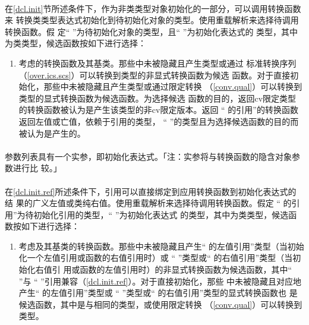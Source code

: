 \paragraph{}
在\ref{dcl.init}节所述条件下，作为非类类型对象初始化的一部分，可以调用转换函数来
转换类类型表达式初始化到待初始化对象的类型。使用重载解析来选择待调用转换函数。假
定`` ''为待初始化对象的类型，且`` ''为初始化表达式的
类型，其中为类类型，候选函数按如下进行选择：
\begin{enumerate}
  \item{考虑的转换函数及其基类。那些中未被隐藏且产生类型或通过
    标准转换序列（\ref{over.ics.scs}）可以转换到类型的非显式转换函数为候选
    函数。对于直接初始化，那些中未被隐藏且产生类型或通过限定转换
    （\ref{conv.qual}）可以转换到类型的显式转换函数为候选函数。为选择候选
    函数的目的，返回cv限定类型的转换函数被认为是产生该类型的非cv限定版本。返回
    `` 的引用''的转换函数返回左值或亡值，依赖于引用的类型，
    `` ''的类型且为选择候选函数的目的而被认为是产生的。}
\end{enumerate}

\paragraph{}
参数列表具有一个实参，即初始化表达式。「注：实参将与转换函数的隐含对象参数进行比
较。」

\paragraph{}
在\ref{dcl.init.ref}所述条件下，引用可以直接绑定到应用转换函数到初始化表达式的结
果的广义左值或类纯右值。使用重载解析来选择待调用转换函数。假定
`` 的引用''为待初始化引用的类型，`` ''为初始化表达式
的类型，其中为类类型，候选函数按如下进行选择：
\begin{enumerate}
  \item{考虑及其基类的转换函数。那些中未被隐藏且产生``
    的左值引用''类型（当初始化一个左值引用或函数的右值引用时}）或
    `` ''类型或`` 的右值引用''类型（当初始化右值引
    用或函数的左值引用时）的非显式转换函数为候选函数，其中`` ''与
    `` ''引用兼容（\ref{dcl.init.ref}）。对于直接初始化，那些
    中未被隐藏且对应地产生`` 的左值引用''类型或
    `` ''类型或`` 的右值引用''类型的显式转换函数也
    是候选函数，其中是与相同的类型，或使用限定转换
    （\ref{conv.qual}）可以转换到类型。
\end{enumerate}

